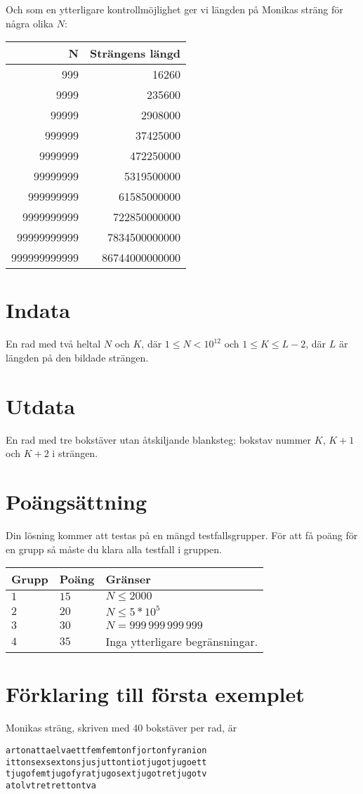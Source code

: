 Och som en ytterligare kontrollmöjlighet ger vi längden på Monikas sträng för några olika $N$:

\begin{tabular}{|r|r|}\hline
{\bf N} & {\bf Strängens längd} \\ \hline
999 & 16260 \\
9999 & 235600 \\
99999 & 2908000 \\
999999 & 37425000 \\
9999999   & 472250000 \\
99999999 & 5319500000\\
999999999 & 61585000000\\
9999999999 & 722850000000 \\
99999999999 &	7834500000000 \\
999999999999 &86744000000000 \\ \hline
\end{tabular}


\section*{Indata}
En rad med två heltal $N$ och $K$, där $1 \leq N < 10^{12}$ och $1 \leq K \leq L-2$, där $L$ är längden på den bildade strängen.

\section*{Utdata}
En rad med tre bokstäver utan åtskiljande blanksteg: bokstav nummer $K$, $K+1$ och $K+2$ i strängen. 

\section*{Poängsättning}
Din lösning kommer att testas på en mängd testfallsgrupper.
För att få poäng för en grupp så måste du klara alla testfall i gruppen.

\noindent
\begin{tabular}{| l | l | p{12cm} |}
  \hline
  \textbf{Grupp} & \textbf{Poäng} & \textbf{Gränser} \\ \hline
  $1$   & $15$       & $N \leq 2000 $\\ \hline
  $2$   & $20$       & $N \leq 5*10^5 $\\ \hline
  $3$   & $30$       & $N = 999\,999\,999\,999 $\\ \hline
  $4$   & $35$       & Inga ytterligare begränsningar. \\ \hline
\end{tabular}

\section*{Förklaring till första exemplet}

Monikas sträng, skriven med 40 bokstäver per rad, är

\begin{verbatim}
artonattaelvaettfemfemtonfjortonfyranion
ittonsexsextonsjusjuttontiotjugotjugoett
tjugofemtjugofyratjugosextjugotretjugotv
atolvtretrettontva
\end{verbatim}
